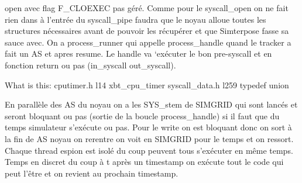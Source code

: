\documentclass{article}
\begin{document}
open avec flag F\_CLOEXEC pas géré. Comme pour le syscall\_open on ne fait rien dans à l'entrée du syscall\_pipe faudra que le noyau alloue toutes les structures nécessaires avant de pouvoir les récupérer et que Simterpose fasse sa sauce avec. 
On a process\_runner qui appelle process\_handle quand le tracker a fait un AS et apres resume. Le handle va `exécuter le bon pre-syscall et en fonction return ou pas (in\_syscall out\_syscall).

What is this: cputimer.h l14 {\color{purple} xbt\_cpu\_timer} syscall\_data.h
l259 {\color{purple} typedef union}

En parallèle des AS du noyau on a les SYS\_stem de SIMGRID qui sont lancés et seront bloquant ou pas (sortie de la boucle process\_handle) si il faut que du temps simulateur s'exécute ou pas. Pour le write on est bloquant donc on sort à la fin de AS noyau on rerentre on voit en SIMGRID pour le temps et on ressort. Chaque thread espion est isolé du coup peuvent tous s'exécuter en même temps. Temps en discret du coup à t après un timestamp on exécute tout le code qui peut l'être et on revient au prochain timestamp.
\end{document}
